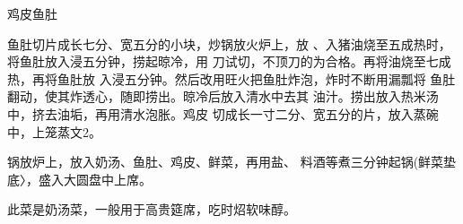 \begin{recipe}{鸡皮鱼肚}

\ingredients


\cooking

\step 鱼肚切片成长七分、宽五分的小块，炒锅放火炉上，放 、入猪油烧至五成热时，将鱼肚放入浸五分钟，捞起晾冷，用 刀试切，不顶刀的为合格。再将油烧至七成热，再将鱼肚放 入浸五分钟。然后改用旺火把鱼肚炸泡，炸时不断用漏瓢将 鱼肚翻动，使其炸透心，随即捞出。晾冷后放入清水中去其 油汁。捞出放入热米汤中，挤去油垢，再用清水泡胀。鸡皮 切成长一寸二分、宽五分的片，放入蒸碗中，上笼蒸文2。

\step 锅放炉上，放入奶汤、鱼肚、鸡皮、鲜菜，再用盐、 料酒等煮三分钟起锅(鲜菜垫底〉，盛入大圆盘中上席。

\notes

此菜是奶汤菜，一般用于高贵筵席，吃时炤软味醇。

\end{recipe}

